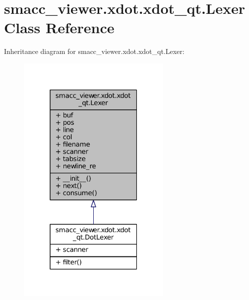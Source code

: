 \hypertarget{classsmacc__viewer_1_1xdot_1_1xdot__qt_1_1Lexer}{}\section{smacc\+\_\+viewer.\+xdot.\+xdot\+\_\+qt.\+Lexer Class Reference}
\label{classsmacc__viewer_1_1xdot_1_1xdot__qt_1_1Lexer}


Inheritance diagram for smacc\+\_\+viewer.\+xdot.\+xdot\+\_\+qt.\+Lexer\+:
\nopagebreak
\begin{figure}[H]
\begin{center}
\leavevmode
\includegraphics[width=211pt]{classsmacc__viewer_1_1xdot_1_1xdot__qt_1_1Lexer__inherit__graph}
\end{center}
\end{figure}


